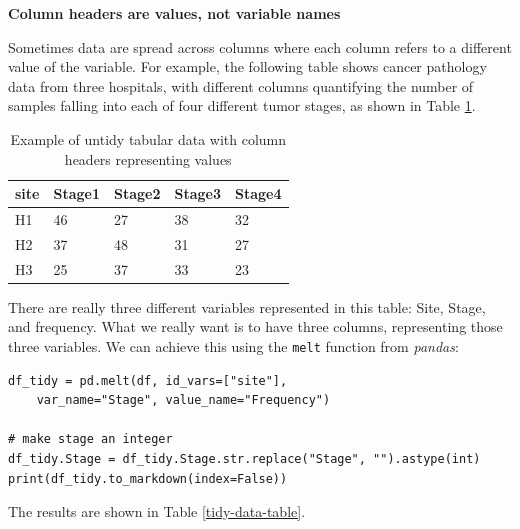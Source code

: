 \textbf{Column headers are values, not variable names}

Sometimes data are spread across columns where each column refers to a different value of the variable.  For example, the following table shows cancer pathology data from three hospitals, with different columns quantifying the number of samples falling into each of four different tumor stages, as shown in Table \ref{untidy-data-table}.

\bigskip\noindent
\begin{table}[!htbp]
\centering
\begin{tabular}{p{}p{}p{}p{}p{}}
\toprule
site & Stage1 & Stage2 & Stage3 & Stage4 \\
\hline
H1 & 46 & 27 & 38 & 32 \\
H2 & 37 & 48 & 31 & 27 \\
H3 & 25 & 37 & 33 & 23 \\
\bottomrule
\end{tabular}
\caption{Example of untidy tabular data with column headers representing values}
\label{untidy-data-table}
\end{table}

\bigskip

\bigskip

There are really three different variables represented in this table: Site, Stage, and frequency.  What we really want is to have three columns, representing those three variables.  We can achieve this using the \texttt{melt} function from \textit{pandas}:

\begin{lstlisting}[style=Python]
df_tidy = pd.melt(df, id_vars=["site"], 
    var_name="Stage", value_name="Frequency")

# make stage an integer
df_tidy.Stage = df_tidy.Stage.str.replace("Stage", "").astype(int)
print(df_tidy.to_markdown(index=False))
\end{lstlisting}

The results are shown in Table \ref{tidy-data-table}.

